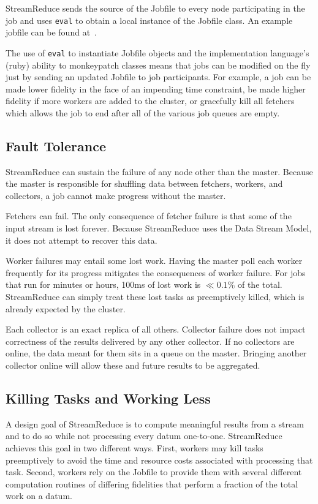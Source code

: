 \documentclass[12pt,twocolumn]{article}
\begin{document}
StreamReduce sends the source of the Jobfile to every node participating in the job and uses
\texttt{eval} to
obtain a local instance of the Jobfile class. An example jobfile can be found at~\cite{github}.

The use of \texttt{eval} to instantiate Jobfile objects and the implementation language's (ruby)
ability to monkeypatch classes means that jobs can be modified on the fly just by sending
an updated Jobfile to job participants. For example, a job can be made lower fidelity in
the face of an impending time constraint, be made higher fidelity if more workers are added to
the cluster, or gracefully kill all fetchers which allows the job to end after all of the
various job queues are empty.
\subsection{Fault Tolerance}
StreamReduce can sustain the failure of any node other than the master. Because the master is responsible
for shuffling data between fetchers, workers, and collectors, a job cannot make progress without
the master.

Fetchers can fail. The only consequence of fetcher failure is that some of the input stream is
lost forever. Because StreamReduce uses the Data Stream Model, it does not attempt to recover this data.

Worker failures may entail some lost work. Having the master poll each worker frequently for its
progress mitigates the consequences of worker failure. For jobs that run for minutes or hours,
100ms of lost work is $\ll0.1\%$ of the total. StreamReduce can simply treat these lost tasks as preemptively
killed, which is already expected by the cluster.

Each collector is an exact replica of all others. Collector failure does not impact correctness of
the results delivered by any other collector. If no collectors are online, the data meant for them
sits in a queue on the master. Bringing another collector online will allow these and future results
to be aggregated.
\subsection{Killing Tasks and Working Less}
A design goal of StreamReduce is to compute meaningful results from a stream and to do so while not
processing every datum one-to-one. StreamReduce achieves this goal in two different ways. First, workers
may kill tasks preemptively to avoid the time and resource costs associated with processing
that task. Second, workers rely on the Jobfile to provide them with several different
computation routines of differing fidelities that perform a fraction of the total work on a
datum.
\end{document}
